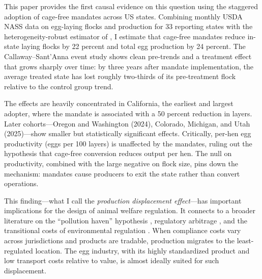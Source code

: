 \documentclass[12pt]{article}
\begin{document}
This paper provides the first causal evidence on this question using the staggered adoption of cage-free mandates across US states. Combining monthly USDA NASS data on egg-laying flocks and production for 33 reporting states with the heterogeneity-robust estimator of \citet{callaway2021difference}, I estimate that cage-free mandates reduce in-state laying flocks by 22 percent and total egg production by 24 percent. The Callaway--Sant'Anna event study shows clean pre-trends and a treatment effect that grows sharply over time: by three years after mandate implementation, the average treated state has lost roughly two-thirds of its pre-treatment flock relative to the control group trend.

The effects are heavily concentrated in California, the earliest and largest adopter, where the mandate is associated with a 50 percent reduction in layers. Later cohorts---Oregon and Washington (2024), Colorado, Michigan, and Utah (2025)---show smaller but statistically significant effects. Critically, per-hen egg productivity (eggs per 100 layers) is unaffected by the mandates, ruling out the hypothesis that cage-free conversion reduces output per hen. The null on productivity, combined with the large negative on flock size, pins down the mechanism: mandates cause producers to exit the state rather than convert operations.

This finding---what I call the \textit{production displacement effect}---has important implications for the design of animal welfare regulation. It connects to a broader literature on the ``pollution haven'' hypothesis \citep{levinson2008unmasking}, regulatory arbitrage \citep{coase1960problem}, and the transitional costs of environmental regulation \citep{walker2013transitional}. When compliance costs vary across jurisdictions and products are tradable, production migrates to the least-regulated location. The egg industry, with its highly standardized product and low transport costs relative to value, is almost ideally suited for such displacement.
\end{document}
